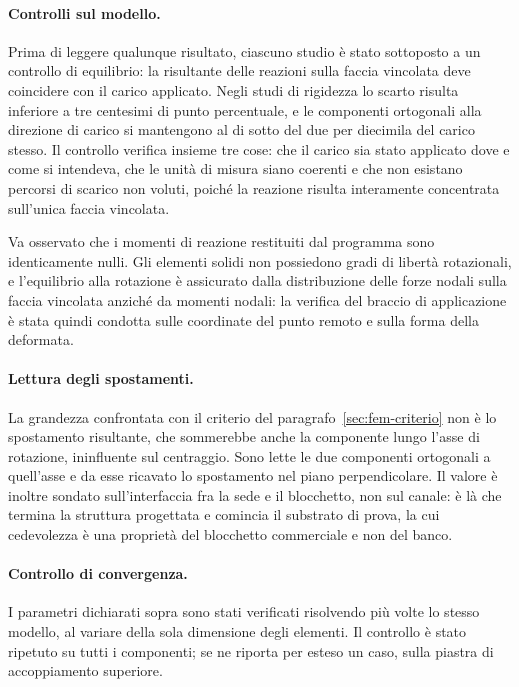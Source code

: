 \paragraph{Controlli sul modello.}
Prima di leggere qualunque risultato, ciascuno studio è stato sottoposto a un
controllo di equilibrio: la risultante delle reazioni sulla faccia vincolata
deve coincidere con il carico applicato. Negli studi di rigidezza lo scarto
risulta inferiore a tre centesimi di punto percentuale, e le componenti
ortogonali alla direzione di carico si mantengono al di sotto del due per
diecimila del carico stesso. Il controllo verifica insieme tre cose: che il
carico sia stato applicato dove e come si intendeva, che le unità di misura
siano coerenti e che non esistano percorsi di scarico non voluti, poiché la
reazione risulta interamente concentrata sull'unica faccia vincolata.

Va osservato che i momenti di reazione restituiti dal programma sono
identicamente nulli. Gli elementi solidi non possiedono gradi di libertà
rotazionali, e l'equilibrio alla rotazione è assicurato dalla distribuzione
delle forze nodali sulla faccia vincolata anziché da momenti nodali: la verifica
del braccio di applicazione è stata quindi condotta sulle coordinate del punto
remoto e sulla forma della deformata.

\paragraph{Lettura degli spostamenti.}
La grandezza confrontata con il criterio del paragrafo~\ref{sec:fem-criterio}
non è lo spostamento risultante, che sommerebbe anche la componente lungo
l'asse di rotazione, ininfluente sul centraggio. Sono lette le due componenti
ortogonali a quell'asse e da esse ricavato lo spostamento nel piano
perpendicolare. Il valore è inoltre sondato sull'interfaccia fra la sede e il
blocchetto, non sul canale: è là che termina la struttura progettata e comincia
il substrato di prova, la cui cedevolezza è una proprietà del blocchetto
commerciale e non del banco.

\paragraph{Controllo di convergenza.}
I parametri dichiarati sopra sono stati verificati risolvendo più volte lo
stesso modello, al variare della sola dimensione degli elementi. Il controllo è
stato ripetuto su tutti i componenti; se ne riporta per esteso un caso, sulla
piastra di accoppiamento superiore.

